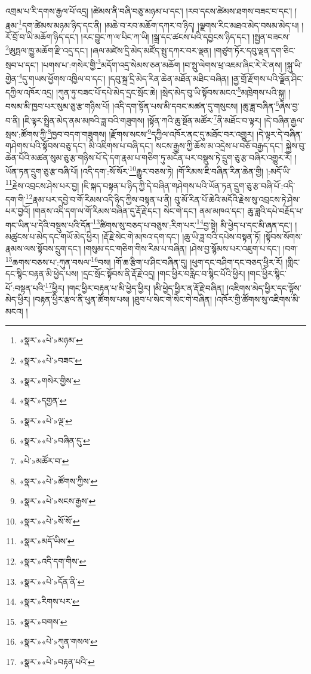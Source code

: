 འགྲམ་པ་རི་དགས་རྒྱལ་པོ་འདྲ། །ཚེམས་ནི་བཞི་བཅུ་མཉམ་པ་དང་། །རབ་དངས་ཚེམས་ཐགས་བཟང་བ་དང་། །རྣམ་\footnote{«སྣར་»«པེ་»མཉམ་}དག་ཚེམས་མཉམ་ཉིད་དང་ནི། །མཆེ་བ་རབ་མཆོག་དཀར་བ་ཉིད། །ལྗགས་རིང་མཐའ་མེད་བསམ་མེད་པ། །རོ་བྲོ་བ་ཡི་མཆོག་ཉིད་དང་། །རང་བྱུང་ཀ་ལ་པིང་ཀ་ཡི། །སྒྲ་དང་ཚངས་པའི་དབྱངས་ཉིད་དང་། །སྤྱན་བཟངས་\footnote{«སྣར་»«པེ་»བཟང་}ཨུཏྤལ་ཁྱུ་མཆོག་རྫི་འདྲ་དང་། །ཞལ་མཛེས་དྲི་མེད་མཛོད་སྤུ་དཀར་བར་ལྡན། །གཙུག་ཏོར་དབུ་ལྡན་དག་ཅིང་སྲབ་པ་དང་། །པགས་པ་:གསེར་གྱི་\footnote{«སྣར་»གསེར་གྱིས་}མདོག་འདྲ་སེམས་ཅན་མཆོག །བ་སྤུ་ལེགས་ཕྲ་འཇམ་ཞིང་རེ་རེ་ནས། །སྐུ་ཡི་གྱེན་\footnote{«སྣར་»དགྱན་}དུ་གཡས་ཕྱོགས་འཁྱིལ་བ་དང་། །དབུ་སྐྲ་དྲི་མེད་རིན་ཆེན་མཐོན་མཐིང་བཞིན། །ནྱ་གྲོ་རྫོགས་པའི་ལྗོན་ཤིང་དཀྱིལ་འཁོར་འདྲ། །ཀུན་ཏུ་བཟང་པོ་དཔེ་མེད་དྲང་སྲོང་ཆེ། །སྲེད་མེད་བུ་ཡི་སྟོབས་མངའ་\footnote{«སྣར་»«པེ་»ལྔ་}མཁྲེགས་པའི་སྐུ། །བསམ་མི་ཁྱབ་པར་སུམ་ཅུ་རྩ་གཉིས་པོ། །འདི་དག་སྟོན་པས་མི་དབང་མཚན་དུ་གསུངས། །ཆུ་ཟླ་བཞིན་\footnote{«སྣར་»«པེ་»བཞིན་དུ་}ཞེས་བྱ་བ་ནི། །ཇི་ལྟར་སྤྲིན་མེད་ནམ་མཁའི་ཟླ་བའི་གཟུགས། །སྟོན་ཀའི་ཆུ་སྔོན་མཚོར་\footnote{«པེ་»མཚོར་བ་}ནི་མཐོང་བ་ལྟར། །དེ་བཞིན་རྒྱལ་སྲས་:ཚོགས་ཀྱི་\footnote{«སྣར་»«པེ་»ཚོགས་ཀྱིས་}ཁྱབ་བདག་གཟུགས། །རྫོགས་སངས་\footnote{«སྣར་»«པེ་»སངས་རྒྱས་}དཀྱིལ་འཁོར་ནང་དུ་མཐོང་བར་འགྱུར། །དེ་ལྟར་དེ་བཞིན་གཤེགས་པའི་སྟོབས་བཅུ་དང་། མི་འཇིགས་པ་བཞི་དང་། སངས་རྒྱས་ཀྱི་ཆོས་མ་འདྲེས་པ་བཅོ་བརྒྱད་དང་། སྐྱེས་བུ་ཆེན་པོའི་མཚན་སུམ་ཅུ་རྩ་གཉིས་པོ་དེ་དག་རྣམ་པ་གཅིག་ཏུ་མངོན་པར་བསྡུས་ཏེ་དྲུག་ཅུ་རྩ་བཞིར་འགྱུར་རོ། །ཡོན་ཏན་དྲུག་ཅུ་རྩ་བཞི་པོ། །འདི་དག་:སོ་སོར་\footnote{«སྣར་»«པེ་»སོ་སོ་}རྒྱུར་བཅས་ཏེ། །གོ་རིམས་ཇི་བཞིན་རིན་ཆེན་གྱི། །:མདོ་ཡི་\footnote{«སྣར་»མདོ་ཡིས་}རྗེས་འབྲངས་ཤེས་པར་བྱ། །ཇི་སྐད་བསྟན་པ་ཉིད་ཀྱི་དེ་བཞིན་གཤེགས་པའི་ཡོན་ཏན་དྲུག་ཅུ་རྩ་བཞི་པོ་:འདི་དག་གི་\footnote{«སྣར་»འདི་དག་གིས་}རྣམ་པར་དབྱེ་བ་གོ་རིམས་འདི་ཉིད་ཀྱིས་བསྟན་པ་ནི། བུ་མོ་རིན་པོ་ཆེའི་མདོའི་རྗེས་སུ་འབྲངས་ཏེ་ཤེས་པར་བྱའོ། །གནས་འདི་དག་ལ་གོ་རིམས་བཞིན་དུ་རྡོ་རྗེ་དང་། སེང་གེ་དང་། ནམ་མཁའ་དང་། ཆུ་ཟླའི་དཔེ་བརྗོད་པ་གང་ཡིན་པ་དེའི་བསྡུས་པའི་དོན་\footnote{«སྣར་»«པེ་»དོན་ནི་}ཚིགས་སུ་བཅད་པ་བཅུས་:རིག་པར་\footnote{«སྣར་»རིགས་པར་}བྱ་སྟེ། མི་ཕྱེད་པ་དང་མི་ཞན་དང་། །མཚུངས་པ་མེད་དང་གཡོ་མེད་ཕྱིར། །རྡོ་རྗེ་སེང་གེ་མཁའ་དག་དང་། །ཆུ་ཡི་ཟླ་བའི་དཔེས་བསྟན་ཏོ། །སྟོབས་སོགས་རྣམས་ལས་སྟོབས་དྲུག་དང་། །གསུམ་དང་གཅིག་གིས་རིམ་པ་བཞིན། །ཤེས་བྱ་སྙོམས་པར་འཇུག་པ་དང་། །བག་\footnote{«སྣར་»བགས་}ཆགས་བཅས་པ་:ཀུན་བསལ་\footnote{«སྣར་»«པེ་»ཀུན་གསལ་}བས། །གོ་ཆ་རྩིག་པ་ཤིང་བཞིན་དུ། །ཕུག་དང་བཤིག་དང་བཅད་ཕྱིར་རོ། །གླིང་དང་སྙིང་བརྟན་མི་ཕྱེད་པས། །དྲང་སྲོང་སྟོབས་ནི་རྡོ་རྗེ་འདྲ། །གང་ཕྱིར་བརླིང་བ་སྙིང་པོའི་ཕྱིར། །གང་ཕྱིར་སྙིང་པོ་:བསྟན་པའི་\footnote{«སྣར་»«པེ་»བརྟན་པའི་}ཕྱིར། །གང་ཕྱིར་བརྟན་པ་མི་ཕྱེད་ཕྱིར། །མི་ཕྱེད་ཕྱིར་ན་རྡོ་རྗེ་བཞིན། །འཇིགས་མེད་ཕྱིར་དང་ལྟོས་མེད་ཕྱིར། །བརྟན་ཕྱིར་རྩལ་ནི་ཕུན་ཚོགས་པས། །ཐུབ་པ་སེང་གེ་སེང་གེ་བཞིན། །འཁོར་གྱི་ཚོགས་སུ་འཇིགས་མི་མངའ། །
